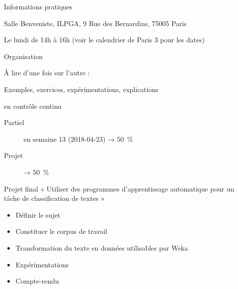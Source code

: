 \documentclass[hyperref={unicode}, xcolor={svgnames}, french]{beamer}
\title{\titlepagetitle}
\author{\textbf{\myname} (\mylab)}
\institute{}
\date{\conference\\\docdate}
\begin{document}

\begin{frame}[plain]
	\titlepage
\end{frame}

\begin{frame}{Informations pratiques}
    \begin{description}[*]
        \item[Où] Salle Benveniste, ILPGA, 9 Rue des Bernardins, 75005 Paris
        \item[Quand] Le lundi de 14h à 16h (voir le calendrier de Paris 3 pour les dates)
        \item[Contact] 
        \item[Web] {}
    \end{description}
\end{frame}

\begin{frame}{Organisation}
    \begin{description}[*]
        \item[Poly] À lire d'une fois sur l'autre :\\
                    {\footnotesize{}}
        \item[Cours] Exemples, exercices, expérimentations, explications
        \item[Évaluation] en contrôle continu
            \begin{description}
                \item[Partiel] en semaine 13 (2018-04-23) → \SI{50}{\percent}
                \item[Projet] → \SI{50}{\percent}
            \end{description}
    \end{description}
\end{frame}

\begin{frame}{Projet final}
    « Utiliser des programmes d'apprentissage automatique pour un tâche de classification de textes »
    \begin{itemize}
        \item Définir le sujet
        \item Constituer le corpus de travail
        \item Transformation du texte en données utilisables par Weka
        \item Expérimentations
        \item Compte-rendu
    \end{itemize}
\end{frame}
\end{document}
